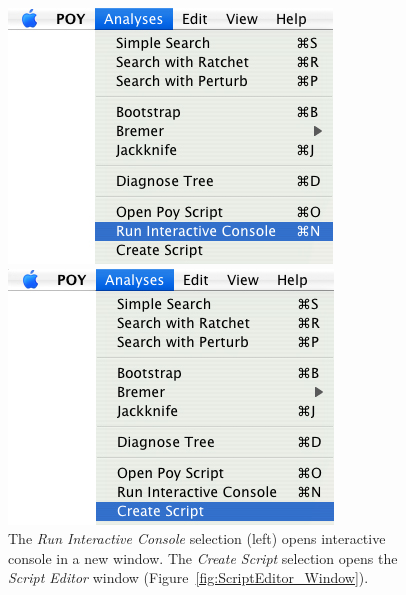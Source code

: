 \begin{figure}
\centering
\begin{minipage}[c]{0.48\textwidth}
   		\includegraphics[width=\textwidth]{figures/runinteractive_menu.jpg}
\end{minipage}
\quad
\begin{minipage}[c]{0.48\textwidth}
	   	\includegraphics[width=\textwidth]{figures/create_script_window.jpg}
   	\end{minipage}
\caption{The \emph{Run Interactive Console} selection (left) opens \poy interactive console in a new window. The \emph{Create Script} selection opens the \emph{Script Editor} window (Figure~\ref{fig:ScriptEditor_Window}).}
\label{fig:runinteractive}
\end{figure}

